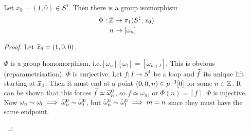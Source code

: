 \begin{thm}
	Let $x_0 = (1,0) \in S^1$.
	Then there is a group isomorphism
	\begin{align*}
		\Phi: \mathbb{Z} &\to \pi_1(S^1,x_0) \\
		n &\mapsto [\omega_n]
	\end{align*}
\end{thm}

\begin{proof}
	Let $\widetilde x_0 = (1,0,0)$.
	\begin{itm}
		\io $\Phi$ is a group homomorphism, i.e.\@ $[\omega_n][\omega_l]=[\omega_{n+l}]$.
		This is obvious (reparametrisation).
		\io $\Phi$ is surjective.
		Let $f: I \to S^1$ be a loop and $\widetilde f$ its unique lift starting at $\widetilde x_0$.
		Then it must end at a point $(0,0,n) \in p^{-1}[0]$ for some $n \in \mathbb{Z}$.
		It can be shown that this forces $\widetilde f \simeq \widetilde \omega_n^0$, so $f \simeq \omega_n$, or $\Phi(n)=[f]$.
		\io $\Phi$ is injective.
		Now $\omega_n \sim \omega_l \implies \widetilde\omega_n^0 \sim \widetilde\omega_l^0$, but $\widetilde\omega_n^0 \sim \widetilde\omega_l^0 \implies m=n$ since they must have the same endpoint. \qedhere
	\end{itm}
\end{proof}